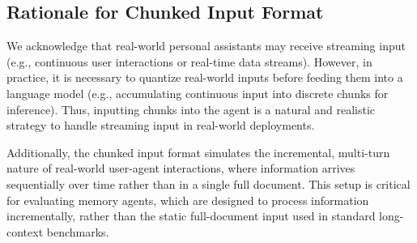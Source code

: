\subsection{Rationale for Chunked Input Format}
We acknowledge that real-world personal assistants may receive streaming input (e.g., continuous user interactions or real-time data streams). However, in practice, it is necessary to quantize real-world inputs before feeding them into a language model (e.g., accumulating continuous input into discrete chunks for inference). Thus, inputting chunks into the agent is a natural and realistic strategy to handle streaming input in real-world deployments.

Additionally, the chunked input format simulates the incremental, multi-turn nature of real-world user-agent interactions, where information arrives sequentially over time rather than in a single full document. This setup is critical for evaluating memory agents, which are designed to process information incrementally, rather than the static full-document input used in standard long-context benchmarks.

